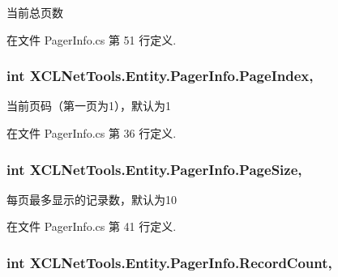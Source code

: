 当前总页数 



在文件 Pager\-Info.\-cs 第 51 行定义.

\hypertarget{class_x_c_l_net_tools_1_1_entity_1_1_pager_info_a2cd0abb6744c59bbd9b98c758a023ac5}{
\subsubsection[{Page\-Index}]{\setlength{\rightskip}{0pt plus 5cm}int X\-C\-L\-Net\-Tools.\-Entity.\-Pager\-Info.\-Page\-Index\hspace{0.3cm}{\ttfamily [get]}, {\ttfamily [set]}}}\label{class_x_c_l_net_tools_1_1_entity_1_1_pager_info_a2cd0abb6744c59bbd9b98c758a023ac5}


当前页码（第一页为1），默认为1 



在文件 Pager\-Info.\-cs 第 36 行定义.

\hypertarget{class_x_c_l_net_tools_1_1_entity_1_1_pager_info_af9b5f737263571d79ead065f6faaa5ca}{
\subsubsection[{Page\-Size}]{\setlength{\rightskip}{0pt plus 5cm}int X\-C\-L\-Net\-Tools.\-Entity.\-Pager\-Info.\-Page\-Size\hspace{0.3cm}{\ttfamily [get]}, {\ttfamily [set]}}}\label{class_x_c_l_net_tools_1_1_entity_1_1_pager_info_af9b5f737263571d79ead065f6faaa5ca}


每页最多显示的记录数，默认为10 



在文件 Pager\-Info.\-cs 第 41 行定义.

\hypertarget{class_x_c_l_net_tools_1_1_entity_1_1_pager_info_a5617d4aaafa80fa664f13cfe7fbc1a6c}{
\subsubsection[{Record\-Count}]{\setlength{\rightskip}{0pt plus 5cm}int X\-C\-L\-Net\-Tools.\-Entity.\-Pager\-Info.\-Record\-Count\hspace{0.3cm}{\ttfamily [get]}, {\ttfamily [set]}}}\label{class_x_c_l_net_tools_1_1_entity_1_1_pager_info_a5617d4aaafa80fa664f13cfe7fbc1a6c}


